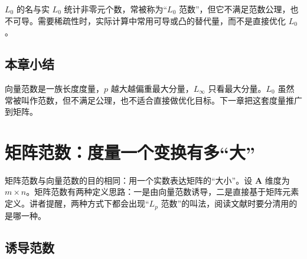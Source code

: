 \documentclass[a4paper]{article}
\begin{document}
\begin{warningbox}{$L_0$ 的名与实}
$L_0$ 统计非零元个数，常被称为“$L_0$ 范数”，但它不满足范数公理，也不可导。需要稀疏性时，实际计算中常用可导或凸的替代量，而不是直接优化 $L_0$。
\end{warningbox}

\subsection{本章小结}

向量范数是一族长度度量，$p$ 越大越偏重最大分量，$L_\infty$ 只看最大分量。$L_0$ 虽然常被叫作范数，但不满足公理，也不适合直接做优化目标。下一章把这套度量推广到矩阵。

\section{矩阵范数：度量一个变换有多“大”}

矩阵范数与向量范数的目的相同：用一个实数表达矩阵的“大小”。设 $\boldsymbol A$ 维度为 $m\times n$。矩阵范数有两种定义思路：一是由向量范数诱导，二是直接基于矩阵元素定义。讲者提醒，两种方式下都会出现“$L_p$ 范数”的叫法，阅读文献时要分清用的是哪一种。

\subsection{诱导范数}
\end{document}
